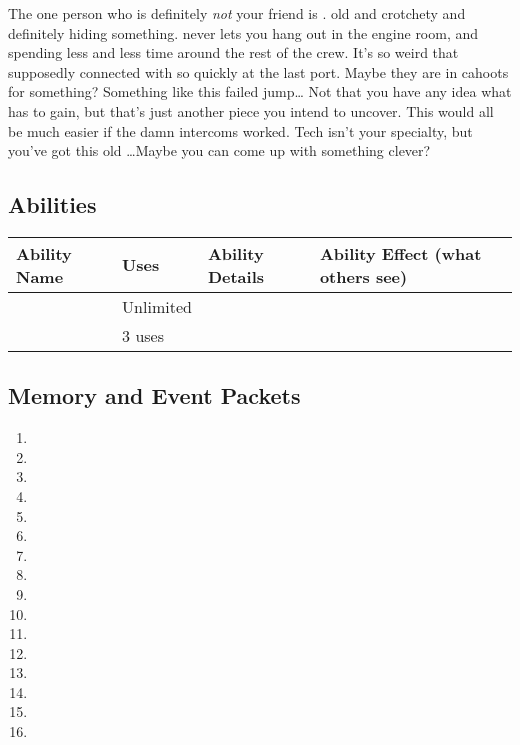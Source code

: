 \documentclass[char]{TMFHope}
\begin{document}
The one person who is definitely \emph{not} your friend is \cEng{\full}. \cEng{\They} \cEng{\are} old and crotchety and definitely hiding something. \cEng{} never lets you hang out in the engine room, and \cEng{\they} \cEng{\are} spending less and less time around the rest of the crew. It's so weird that \cEng{\they} supposedly connected with \cBoy{} so quickly at the last port. Maybe they are in cahoots for something? Something like this failed jump\ldots{} Not that you have any idea what \cEng{} has to gain, but that's just another piece you intend to uncover. This would all be much easier if the damn intercoms worked. Tech isn't your specialty, but you've got this old \iWT{}\ldots Maybe you can come up with something clever?

\subsection*{Abilities}
\begin{tabular}{|p{3cm}|p{1.5cm}|p{6.5cm}|p{5cm}|} 
 \hline
 \textbf{Ability Name} & \textbf{Uses} & \textbf{Ability Details} & \textbf{Ability Effect (what others see)} \\ 
\hline 
 \aThreat{\MYname} & Unlimited & \aThreat{\MYtext} & \aThreat{\MYeffect} \\ 
\hline
 \aFirstAid{\MYname} & 3 uses & \aFirstAid{\MYtext} & \aFirstAid{\MYeffect}\\ 
 \hline
\end{tabular}

\subsection*{Memory and Event Packets}
\begin{enumerate}
	\item \mPractice{\MYname}
	\item \mWAlpha{\MYname}
	\item \mWeaponsOne{\MYname}
	\item \mWeaponsTwo{\MYname}
	\item \mWeaponsThree{\MYname}
	\item \mThreatOne{\MYname}
	\item \mThreatTwo{\MYname}
	\item \mThreatThree{\MYname}
	\item \mThreatFour{\MYname}
	\item \mBroom{\MYname}
	\item \mLab{\MYname}
	\item \mPatient{\MYname}
	\item \mKitchen{\MYname}
	\item \mWeight{\MYname}
	\item \mTheater{\MYname}
	\item \mCrates{\MYname}
\end{enumerate}
\end{document}
